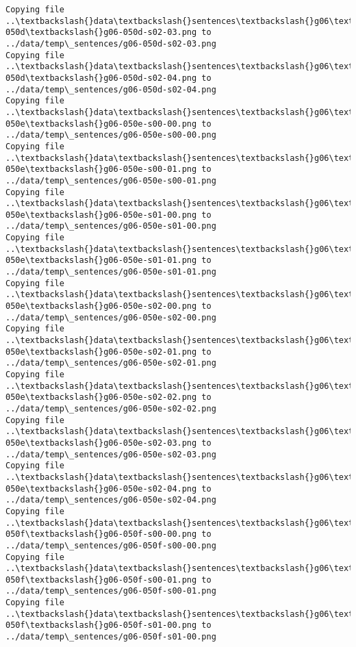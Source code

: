 \documentclass[11pt]{article}
\begin{document}
\begin{Verbatim}[commandchars=\\\{\}]
Copying file ..\textbackslash{}data\textbackslash{}sentences\textbackslash{}g06\textbackslash{}g06-050d\textbackslash{}g06-050d-s02-03.png to
../data/temp\_sentences/g06-050d-s02-03.png
Copying file ..\textbackslash{}data\textbackslash{}sentences\textbackslash{}g06\textbackslash{}g06-050d\textbackslash{}g06-050d-s02-04.png to
../data/temp\_sentences/g06-050d-s02-04.png
Copying file ..\textbackslash{}data\textbackslash{}sentences\textbackslash{}g06\textbackslash{}g06-050e\textbackslash{}g06-050e-s00-00.png to
../data/temp\_sentences/g06-050e-s00-00.png
Copying file ..\textbackslash{}data\textbackslash{}sentences\textbackslash{}g06\textbackslash{}g06-050e\textbackslash{}g06-050e-s00-01.png to
../data/temp\_sentences/g06-050e-s00-01.png
Copying file ..\textbackslash{}data\textbackslash{}sentences\textbackslash{}g06\textbackslash{}g06-050e\textbackslash{}g06-050e-s01-00.png to
../data/temp\_sentences/g06-050e-s01-00.png
Copying file ..\textbackslash{}data\textbackslash{}sentences\textbackslash{}g06\textbackslash{}g06-050e\textbackslash{}g06-050e-s01-01.png to
../data/temp\_sentences/g06-050e-s01-01.png
Copying file ..\textbackslash{}data\textbackslash{}sentences\textbackslash{}g06\textbackslash{}g06-050e\textbackslash{}g06-050e-s02-00.png to
../data/temp\_sentences/g06-050e-s02-00.png
Copying file ..\textbackslash{}data\textbackslash{}sentences\textbackslash{}g06\textbackslash{}g06-050e\textbackslash{}g06-050e-s02-01.png to
../data/temp\_sentences/g06-050e-s02-01.png
Copying file ..\textbackslash{}data\textbackslash{}sentences\textbackslash{}g06\textbackslash{}g06-050e\textbackslash{}g06-050e-s02-02.png to
../data/temp\_sentences/g06-050e-s02-02.png
Copying file ..\textbackslash{}data\textbackslash{}sentences\textbackslash{}g06\textbackslash{}g06-050e\textbackslash{}g06-050e-s02-03.png to
../data/temp\_sentences/g06-050e-s02-03.png
Copying file ..\textbackslash{}data\textbackslash{}sentences\textbackslash{}g06\textbackslash{}g06-050e\textbackslash{}g06-050e-s02-04.png to
../data/temp\_sentences/g06-050e-s02-04.png
Copying file ..\textbackslash{}data\textbackslash{}sentences\textbackslash{}g06\textbackslash{}g06-050f\textbackslash{}g06-050f-s00-00.png to
../data/temp\_sentences/g06-050f-s00-00.png
Copying file ..\textbackslash{}data\textbackslash{}sentences\textbackslash{}g06\textbackslash{}g06-050f\textbackslash{}g06-050f-s00-01.png to
../data/temp\_sentences/g06-050f-s00-01.png
Copying file ..\textbackslash{}data\textbackslash{}sentences\textbackslash{}g06\textbackslash{}g06-050f\textbackslash{}g06-050f-s01-00.png to
../data/temp\_sentences/g06-050f-s01-00.png

\end{Verbatim}
\end{document}
